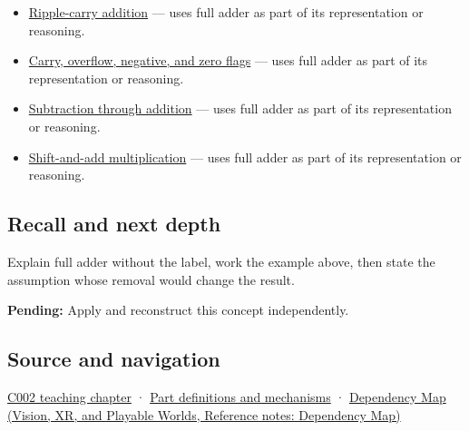 \hypertarget{appendix-d1a5b1e520c2-used-by}{}

\begin{itemize}
\tightlist
\item
  \hyperref[appendix-17917d9fdbe3]{Ripple-carry addition} --- uses full adder as part of its representation or reasoning.
\item
  \hyperref[appendix-8d687c9c08ab]{Carry, overflow, negative, and zero flags} --- uses full adder as part of its representation or reasoning.
\item
  \hyperref[appendix-1c7df340573e]{Subtraction through addition} --- uses full adder as part of its representation or reasoning.
\item
  \hyperref[appendix-a65290d66ed9]{Shift-and-add multiplication} --- uses full adder as part of its representation or reasoning.
\end{itemize}

\subsection{Recall and next depth}\label{appendix-d1a5b1e520c2-recall-and-next-depth}

\hypertarget{appendix-d1a5b1e520c2-recall-and-next-depth}{}

Explain full adder without the label, work the example above, then state the assumption whose removal would change the result.

\textbf{Pending:} Apply and reconstruct this concept independently.

\subsection{Source and navigation}\label{appendix-d1a5b1e520c2-source-and-navigation}

\hypertarget{appendix-d1a5b1e520c2-source-and-navigation}{}

\hyperref[01-foundations-i-ch001-arithmetic-becomes-a-policy]{C002 teaching chapter} · \hyperref[appendix-fd090d982a15]{Part definitions and mechanisms} · \href{../07-Vision-XR-and-Playable-Worlds/main.pdf\#nameddest=appendix-4ad47bdd269a}{Dependency Map (Vision, XR, and Playable Worlds, Reference notes: Dependency Map)}
